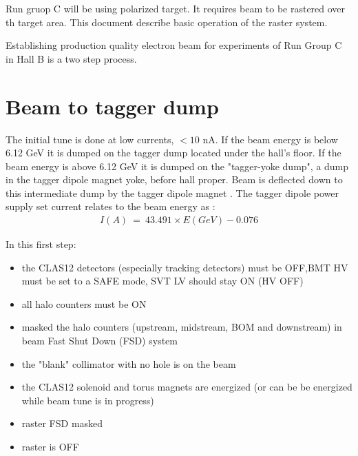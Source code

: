 \indent

Run gruop C will be using polarized target. It requires beam to be rastered over th target area. This document \cite{raster} describe basic operation of the raster system.


Establishing production quality electron beam for experiments of Run Group C in Hall B is a two step process. 

\section{Beam to tagger  dump}
\indent

The initial tune is done at low currents, $<10$ nA. If the beam energy is below 6.12 GeV it is dumped on the tagger dump located under the hall's floor. If the beam energy is above 6.12 GeV  it is dumped on the "tagger-yoke dump", a dump in the tagger dipole magnet yoke, before hall proper. Beam is deflected down to this intermediate dump by the tagger dipole magnet \cite{tagger}. The tagger dipole power supply set current relates to the beam energy as \cite{yokedump}:
\begin{eqnarray}
I(A)~=~43.491\times E(GeV)-0.076
\end{eqnarray}


In this first step:
\begin{itemize}
\item the CLAS12 detectors (especially tracking detectors) must be OFF,BMT HV must be set to a SAFE mode, SVT LV should stay ON (HV OFF)
\item all halo counters must be ON
\item masked the halo counters (upstream, midstream, BOM and downstream) in beam Fast Shut Down (FSD) system 
\item the "blank" collimator with no hole is on the beam
\item the CLAS12 solenoid and torus magnets are energized (or can be be energized while beam tune is in progress)
\item raster FSD masked
\item raster is OFF
\end{itemize}

